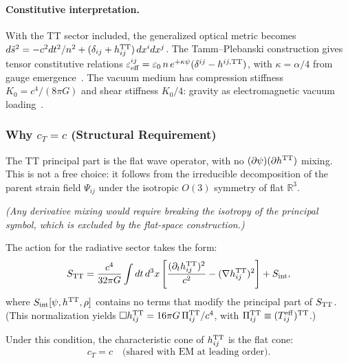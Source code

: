 \paragraph{Constitutive interpretation.}
With the TT sector included, the generalized optical metric becomes
$d\tilde{s}^2 = -c^2 dt^2/n^2 + (\delta_{ij} + h_{ij}^{\rm TT})\,dx^i dx^j$.
The Tamm--Plebanski construction gives tensor constitutive relations
$\varepsilon^{ij}_{\rm eff} = \varepsilon_0\,n\,e^{+\kappa\psi}
(\delta^{ij} - h^{ij,{\rm TT}})$, with $\kappa = \alpha/4$ from
gauge emergence~\cite{AlcockVacuumLoading2026}.
The vacuum medium has compression stiffness $K_0 = c^4/(8\pi G)$
and shear stiffness $K_0/4$: gravity as electromagnetic vacuum
loading~\cite{AlcockVacuumLoading2026}.

\subsubsection{Why $c_T = c$ (Structural Requirement)}

\begin{tcolorbox}[colback=blue!5!white, colframe=blue!60!black, title=Radiative Sector: $O(3)$ Irrep Block-Diagonality]
The TT principal part is the flat wave operator, with no $(\partial\psi)(\partial h^{\rm TT})$ mixing.  This is not a free choice: it follows from the irreducible decomposition of the parent strain field $\Psi_{ij}$ under the isotropic $O(3)$ symmetry of flat $\mathbb{R}^3$.

\textit{(Any derivative mixing would require breaking the isotropy of the principal symbol, which is excluded by the flat-space construction.)}
\end{tcolorbox}

The action for the radiative sector takes the form:
\begin{equation}
S_{\rm TT} = \frac{c^4}{32\pi G}\int dt\,d^3x\left[\frac{(\partial_t h_{ij}^{\rm TT})^2}{c^2} - (\nabla h_{ij}^{\rm TT})^2\right] + S_{\rm int},
\end{equation}
where $S_{\rm int}[\psi, h^{\rm TT}, \rho]$ contains no terms that modify the principal part of $S_{\rm TT}$. (This normalization yields $\Box h_{ij}^{\rm TT} = 16\pi G\, \Pi_{ij}^{\rm TT}/c^4$, with $\Pi_{ij}^{\rm TT} \equiv (T_{ij}^{\rm eff})^{\rm TT}$.)

Under this condition, the characteristic cone of $h_{ij}^{\rm TT}$ is the flat cone:
\begin{equation}
c_T = c \quad \text{(shared with EM at leading order).}
\end{equation}


